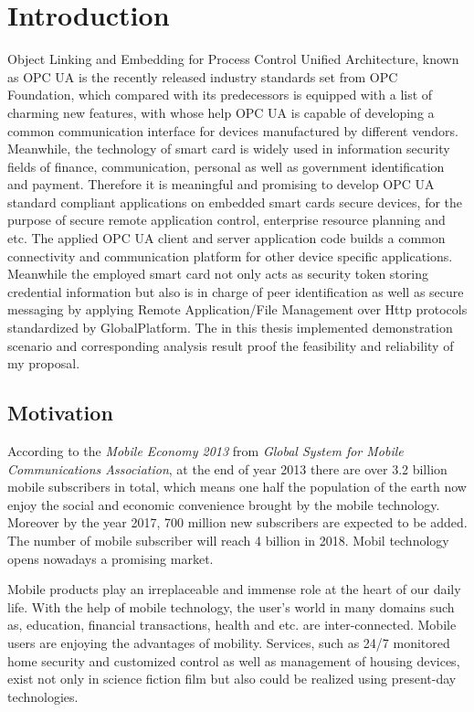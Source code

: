 \chapter{Introduction}\label{secIntroduction}

Object Linking and Embedding for Process Control Unified Architecture, known as OPC UA is the recently released industry standards set from OPC Foundation, which compared with its predecessors is equipped with a list of charming new features, with whose help OPC UA is capable of developing a common communication interface for devices manufactured by different vendors. Meanwhile, the technology of smart card is widely used in information security fields of finance, communication, personal as well as government identification and payment. Therefore it is meaningful and promising to develop OPC UA standard compliant applications on embedded smart cards secure devices, for the purpose of secure remote application    control, enterprise resource planning and etc. The applied OPC UA client and server application code builds a common connectivity and communication platform for other device specific applications. Meanwhile the employed smart card not only acts as security token storing credential information but also is in charge of peer identification as well as secure messaging by applying Remote Application/File Management over Http protocols standardized by GlobalPlatform. The in this thesis implemented demonstration scenario and corresponding analysis result proof the feasibility and reliability of my proposal. 

\section{Motivation}\label{secMotivation}

According to the \emph{Mobile Economy 2013} from \emph{Global System for Mobile Communications Association}, at the end of year 2013 there are over 3.2 billion mobile subscribers in total, which means one half the population of the earth now enjoy the social and economic convenience brought by the mobile technology. Moreover by the year 2017, 700 million new subscribers are expected to be added. The number of mobile subscriber will reach 4 billion in 2018. Mobil technology opens nowadays a promising market.

Mobile products play an irreplaceable and immense role at the heart of our daily life. With the help of mobile technology, the user's world in many domains such as, education, financial transactions, health and etc. are inter-connected. Mobile users are enjoying the advantages of mobility. Services, such as 24/7 monitored home security and customized control as well as management of housing devices, exist not only in science fiction film but also could be realized using present-day technologies.

